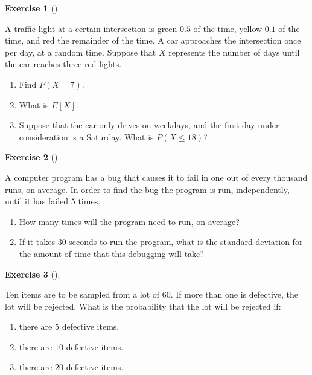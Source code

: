 \documentclass[
  letterpaper,
  DIV=11,
  numbers=noendperiod]{scrreprt}
\providecommand{\tightlist}{%
  \setlength{\itemsep}{0pt}\setlength{\parskip}{0pt}}\usepackage{longtable,booktabs,array}
\theoremstyle{definition}
\newtheorem{exercise}{Exercise}[chapter]
\theoremstyle{definition}
\theoremstyle{definition}
\theoremstyle{remark}
\begin{document}
\begin{exercise}[]\protect\hypertarget{exr-8.13}{}\label{exr-8.13}

A traffic light at a certain intersection is green \(0.5\) of the time,
yellow \(0.1\) of the time, and red the remainder of the time. A car
approaches the intersection once per day, at a random time. Suppose that
\(X\) represents the number of days until the car reaches three red
lights.

\begin{enumerate}
\def\labelenumi{\alph{enumi}.}
\tightlist
\item
  Find \(P(X = 7)\).
\item
  What is \(E[X]\).
\item
  Suppose that the car only drives on weekdays, and the first day under
  consideration is a Saturday. What is \(P(X \leq 18)\)?
\end{enumerate}

\end{exercise}

\begin{exercise}[]\protect\hypertarget{exr-8.14}{}\label{exr-8.14}

A computer program has a bug that causes it to fail in one out of every
thousand runs, on average. In order to find the bug the program is run,
independently, until it has failed \(5\) times.

\begin{enumerate}
\def\labelenumi{\alph{enumi}.}
\tightlist
\item
  How many times will the program need to run, on average?
\item
  If it takes \(30\) seconds to run the program, what is the standard
  deviation for the amount of time that this debugging will take?
\end{enumerate}

\end{exercise}

\begin{exercise}[]\protect\hypertarget{exr-8.15}{}\label{exr-8.15}

Ten items are to be sampled from a lot of \(60\). If more than one is
defective, the lot will be rejected. What is the probability that the
lot will be rejected if:

\begin{enumerate}
\def\labelenumi{\alph{enumi}.}
\tightlist
\item
  there are \(5\) defective items.
\item
  there are \(10\) defective items.
\item
  there are \(20\) defective items.
\end{enumerate}

\end{exercise}
\end{document}

